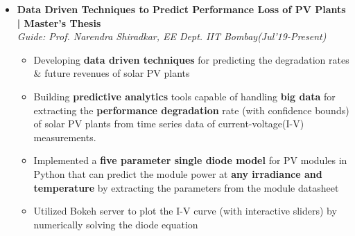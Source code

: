 \documentclass[a4paper, 10pt]{article}
\newcommand{\isep}{-2 pt}
\begin{document}
\begin{itemize} \itemsep \isep 
\vspace{-0.05cm}

\item \textbf{\large Data Driven Techniques to Predict Performance Loss of PV Plants | Master's Thesis}\\
 \textit{Guide: Prof. Narendra Shiradkar, EE Dept. IIT Bombay}\hfill{\em{(Jul'19-Present)}}\\
\vspace{2pt}
	\begin{itemize}\itemsep \isep
	\vspace{-0.7cm}
		\item Developing \textbf{data driven techniques} for predicting the degradation rates \& future revenues of solar PV plants
\item Building \textbf{predictive analytics} tools capable of handling \textbf{big data} for extracting the \textbf{performance degradation} rate (with confidence bounds) of solar PV plants from time series data of current-voltage(I-V) measurements.
		\item  Implemented a \textbf{five parameter single diode model} for PV modules in Python that can predict the module power at \textbf{any irradiance and temperature} by extracting the parameters from the module datasheet
	\item Utilized Bokeh server to plot the I-V curve (with interactive sliders) by numerically solving the diode equation
    \end{itemize}


\end{itemize}
\end{document}
